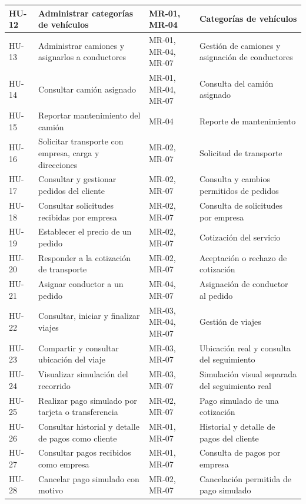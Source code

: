 \begin{longtable}{@{}>{\RaggedRight\arraybackslash}p{1.7cm}>{\RaggedRight\arraybackslash}p{3.9cm}>{\RaggedRight\arraybackslash}p{2.8cm}>{\RaggedRight\arraybackslash}p{7cm}@{}}
		HU-12 & Administrar categorías de vehículos & MR-01, MR-04 & Categorías de vehículos \\ \midrule
		HU-13 & Administrar camiones y asignarlos a conductores & MR-01, MR-04, MR-07 & Gestión de camiones y asignación de conductores \\ \midrule
		HU-14 & Consultar camión asignado & MR-01, MR-04, MR-07 & Consulta del camión asignado \\ \midrule
		HU-15 & Reportar mantenimiento del camión & MR-04 & Reporte de mantenimiento \\ \midrule
		HU-16 & Solicitar transporte con empresa, carga y direcciones & MR-02, MR-07 & Solicitud de transporte \\ \midrule
		HU-17 & Consultar y gestionar pedidos del cliente & MR-02, MR-07 & Consulta y cambios permitidos de pedidos \\ \midrule
		HU-18 & Consultar solicitudes recibidas por empresa & MR-02, MR-07 & Consulta de solicitudes por empresa \\ \midrule
		HU-19 & Establecer el precio de un pedido & MR-02, MR-07 & Cotización del servicio \\ \midrule
		HU-20 & Responder a la cotización de transporte & MR-02, MR-07 & Aceptación o rechazo de cotización \\ \midrule
		HU-21 & Asignar conductor a un pedido & MR-04, MR-07 & Asignación de conductor al pedido \\ \midrule
		HU-22 & Consultar, iniciar y finalizar viajes & MR-03, MR-04, MR-07 & Gestión de viajes \\ \midrule
		HU-23 & Compartir y consultar ubicación del viaje & MR-03, MR-07 & Ubicación real y consulta del seguimiento \\ \midrule
		HU-24 & Visualizar simulación del recorrido & MR-03, MR-07 & Simulación visual separada del seguimiento real \\ \midrule
		HU-25 & Realizar pago simulado por tarjeta o transferencia & MR-02, MR-07 & Pago simulado de una cotización \\ \midrule
		HU-26 & Consultar historial y detalle de pagos como cliente & MR-01, MR-07 & Historial y detalle de pagos del cliente \\ \midrule
		HU-27 & Consultar pagos recibidos como empresa & MR-01, MR-07 & Consulta de pagos por empresa \\ \midrule
		HU-28 & Cancelar pago simulado con motivo & MR-02, MR-07 & Cancelación permitida de pago simulado \\ \midrule

\end{longtable}
